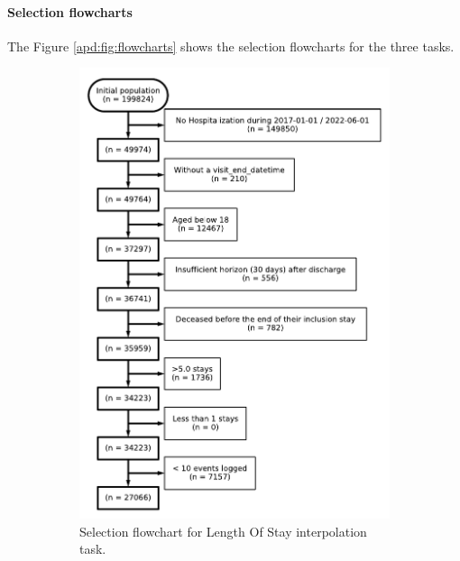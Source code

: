 \documentclass[french,12pt,twoside,a4paper]{book}
\begin{document}
\begin{appendices}
  \paragraph{Selection flowcharts}\label{apd:tasks:flowcharts}

  The Figure \ref{apd:fig:flowcharts} shows the selection flowcharts for the three tasks.

  \begin{figure}[!h]
    \centering
    \begin{subfigure}[b]{0.45\textwidth}
      \centering
      \includegraphics[width=\textwidth]{img/chapter_3/flowchart_t1_los.pdf}
      \caption{Selection flowchart for Length Of Stay interpolation task.}
      \label{apd:fig:flowchart_t1}
    \end{subfigure}
    \hfill
    \begin{subfigure}[b]{0.5\textwidth}

\end{subfigure}
\end{figure}
\end{appendices}
\end{document}
